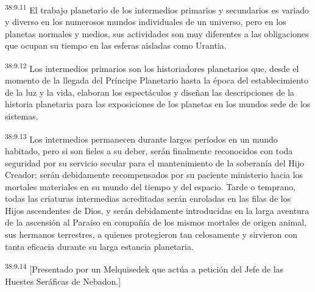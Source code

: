 \par
\textsuperscript{38:9.11} El trabajo planetario de los intermedios primarios y secundarios es variado y diverso en los numerosos mundos individuales de un universo, pero en los planetas normales y medios, sus actividades son muy diferentes a las obligaciones que ocupan su tiempo en las esferas aisladas como Urantia.

\par
\textsuperscript{38:9.12} Los intermedios primarios son los historiadores planetarios que, desde el momento de la llegada del Príncipe Planetario hasta la época del establecimiento de la luz y la vida, elaboran los espectáculos y diseñan las descripciones de la historia planetaria para las exposiciones de los planetas en los mundos sede de los sistemas.

\par
\textsuperscript{38:9.13} Los intermedios permanecen durante largos períodos en un mundo habitado, pero si son fieles a su deber, serán finalmente reconocidos con toda seguridad por su servicio secular para el mantenimiento de la soberanía del Hijo Creador; serán debidamente recompensados por su paciente ministerio hacia los mortales materiales en su mundo del tiempo y del espacio. Tarde o temprano, todas las criaturas intermedias acreditadas serán enroladas en las filas de los Hijos ascendentes de Dios, y serán debidamente introducidas en la larga aventura de la ascensión al Paraíso en compañía de los mismos mortales de origen animal, sus hermanos terrestres, a quienes protegieron tan celosamente y sirvieron con tanta eficacia durante su larga estancia planetaria.

\par
\textsuperscript{38:9.14} [Presentado por un Melquisedek que actúa a petición del Jefe de las Huestes Seráficas de Nebadon.]